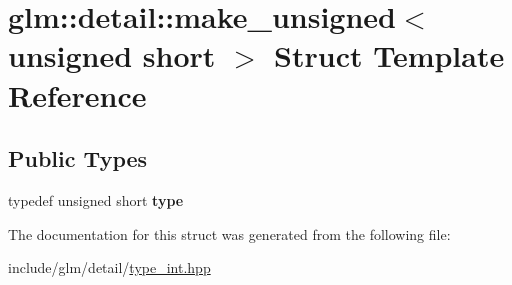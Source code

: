 \hypertarget{structglm_1_1detail_1_1make__unsigned_3_01unsigned_01short_01_4}{}\section{glm\+:\+:detail\+:\+:make\+\_\+unsigned$<$ unsigned short $>$ Struct Template Reference}
\label{structglm_1_1detail_1_1make__unsigned_3_01unsigned_01short_01_4}
\subsection*{Public Types}
\begin{DoxyCompactItemize}
\item 
\mbox{\label{structglm_1_1detail_1_1make__unsigned_3_01unsigned_01short_01_4_a42829000435f69c3a00675b6914f0d33}} 
typedef unsigned short {\bfseries type}
\end{DoxyCompactItemize}


The documentation for this struct was generated from the following file\+:\begin{DoxyCompactItemize}
\item 
include/glm/detail/\hyperlink{type__int_8hpp}{type\+\_\+int.\+hpp}\end{DoxyCompactItemize}
